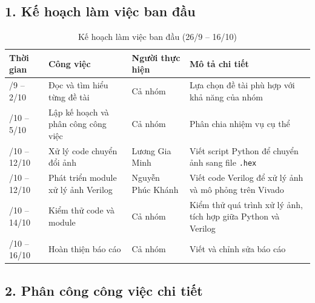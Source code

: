 \subsection*{1. Kế hoạch làm việc ban đầu}
\begin{table}[h]
\centering
\renewcommand{\arraystretch}{1.3} 
\setlength{\tabcolsep}{5pt}       
\begin{tabular}{|>{\centering\arraybackslash}m{2.5cm}|>{\centering\arraybackslash}m{4cm}|>{\centering\arraybackslash}m{3cm}|>{\centering\arraybackslash}m{5cm}|}
\hline
\textbf{Thời gian} & 
\textbf{Công việc} & 
\textbf{Người thực hiện} & 
\textbf{Mô tả chi tiết} \tabularnewline
\hline
26/9 -- 2/10 & 
Đọc và tìm hiểu từng đề tài & 
Cả nhóm & 
Lựa chọn đề tài phù hợp với khả năng của nhóm \tabularnewline
\hline
3/10 -- 5/10 & 
Lập kế hoạch và phân công công việc & 
Cả nhóm & 
Phân chia nhiệm vụ cụ thể \tabularnewline
\hline
7/10 -- 12/10 & 
Xử lý code chuyển đổi ảnh & 
Lương Gia Minh & 
Viết script Python để chuyển ảnh sang file \texttt{.hex} \tabularnewline
\hline
7/10 -- 12/10 & 
Phát triển module xử lý ảnh Verilog & 
Nguyễn Phúc Khánh & 
Viết code Verilog để xử lý ảnh và mô phỏng trên Vivado \tabularnewline
\hline
13/10 -- 14/10 & 
Kiểm thử code và module & 
Cả nhóm & 
Kiểm thử quá trình xử lý ảnh, tích hợp giữa Python và Verilog \tabularnewline
\hline
15/10 -- 16/10 & 
Hoàn thiện báo cáo & 
Cả nhóm & 
Viết và chỉnh sửa báo cáo \tabularnewline
\hline
\end{tabular}
\caption{Kế hoạch làm việc ban đầu (26/9 -- 16/10)}
\end{table}

\subsection*{2. Phân công công việc chi tiết}

